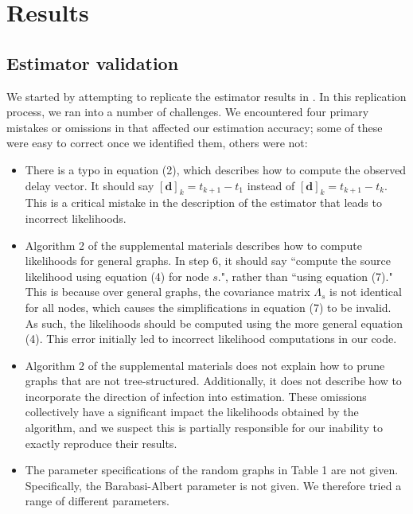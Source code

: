 \documentclass[10pt, twocolumn]{article}
\begin{document}
\section{Results}
\subsection{Estimator validation}
We started by attempting to replicate the estimator results in \cite{pinto}. 
In this replication process, we ran into a number of challenges. We encountered four primary mistakes or omissions in \cite{pinto} that affected our estimation accuracy; some of these were easy to correct once we identified them, others were not:
\begin{itemize}
\item There is a typo in equation (2), which describes how to compute the observed delay vector. It should say $[\boldsymbol d]_k=t_{k+1}-t_1$ instead of $[\boldsymbol d]_k=t_{k+1}-t_k$. This is a critical mistake in the description of the estimator that leads to incorrect likelihoods. 
\item Algorithm 2 of the supplemental materials describes how to compute likelihoods for general graphs. In step 6, it should say ``compute the source likelihood using equation (4) for node $s$.", rather than ``using equation (7)." This is because over general graphs, the covariance matrix $\Lambda_s$ is not identical for all nodes, which causes the simplifications in equation (7) to be invalid. As such, the likelihoods should be computed using the more general equation (4). This error initially led to incorrect likelihood computations in our code.
\item Algorithm 2 of the supplemental materials does not explain how to prune graphs that are not tree-structured. Additionally, it does not describe how to incorporate the direction of infection into estimation. These omissions collectively have a significant impact the likelihoods obtained by the algorithm, and we suspect this is partially responsible for our inability to exactly reproduce their results.
\item The parameter specifications of the random graphs in Table 1 are not given. Specifically, the Barabasi-Albert parameter is not given. We therefore tried a range of different parameters.
\end{itemize}
\end{document}
